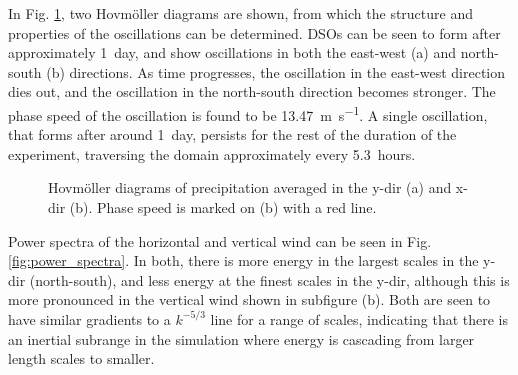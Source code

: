\documentclass[11pt,a4paper]{article}
\begin{document}
In Fig. \ref{fig:hovmollers}, two Hovm{\"o}ller diagrams are shown, from which the structure and properties of the oscillations can be determined. DSOs can be seen to form after approximately \SI{1}{day}, and show oscillations in both the east-west (a) and north-south (b) directions. As time progresses, the oscillation in the east-west direction dies out, and the oscillation in the north-south direction becomes stronger. The phase speed of the oscillation is found to be \SI{13.47}{m.s^{-1}}. A single oscillation, that forms after around \SI{1}{day}, persists for the rest of the duration of the experiment, traversing the domain approximately every \SI{5.3}{hours}.

\begin{figure}[hbt!]%
    \centering
    \qquad
    \caption{Hovm{\"o}ller diagrams of precipitation averaged in the y-dir (a) and x-dir (b). Phase speed is marked on (b) with a red line. }%
    \label{fig:hovmollers}%
\end{figure}

Power spectra of the horizontal and vertical wind can be seen in Fig. \ref{fig:power_spectra}. In both, there is more energy in the largest scales in the y-dir (north-south), and less energy at the finest scales in the y-dir, although this is more pronounced in the vertical wind shown in subfigure (b). Both are seen to have similar gradients to a $k^{-5/3}$ line for a range of scales, indicating that there is an inertial subrange in the simulation where energy is cascading from larger length scales to smaller.
\end{document}
